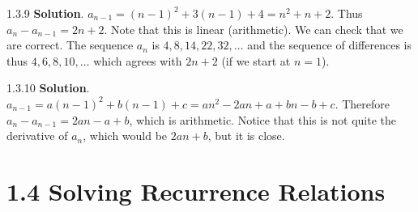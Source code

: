 \documentclass[11pt,]{book}
\theoremstyle{ptxplainnotitle}
\theoremstyle{ptxplaintitle}
\theoremstyle{ptxdefinitionnotitle}
\theoremstyle{ptxdefinitiontitle}
\theoremstyle{ptxdefinitionnotitle}
\theoremstyle{ptxdefinitiontitle}
\theoremstyle{ptxdefinitionnotitle}
\theoremstyle{ptxdefinitiontitle}
\theoremstyle{ptxdefinitiontitlenonumber}
\theoremstyle{ptxdefinitiontitlenonumber}
\numberwithin{equation}{chapter}
\begin{document}
\begin{divisionexercise}{1.3.9}
\textbf{Solution}.\quad%
\hypertarget{p-405}{}%
\(a_{n-1} = (n-1)^2 + 3(n-1) + 4 = n^2 + n + 2\text{.}\) Thus \(a_n - a_{n-1} = 2n+2\text{.}\) Note that this is linear (arithmetic). We can check that we are correct. The sequence \(a_n\) is \(4, 8, 14, 22, 32, \ldots\) and the sequence of differences is thus \(4, 6, 8, 10,\ldots\) which agrees with \(2n+2\) (if we start at \(n = 1\)).%
\end{divisionexercise}%
\begin{divisionexercise}{1.3.10}
\textbf{Solution}.\quad%
\hypertarget{p-407}{}%
\(a_{n-1} = a(n-1)^2 + b(n-1) + c = an^2 - 2an + a + bn - b + c\). Therefore \(a_n - a_{n-1} = 2an - a + b\), which is arithmetic. Notice that this is not quite the derivative of \(a_n\), which would be \(2an + b\), but it is close.%
\end{divisionexercise}%
\section*{1.4 Solving Recurrence Relations}
\end{document}
